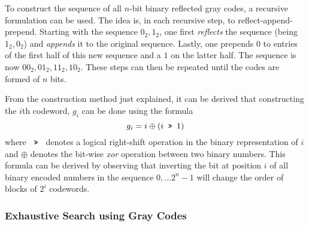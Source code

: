 To construct the sequence of all $n$-bit binary reflected gray codes, a recursive formulation can be used. The idea is, in each recursive step, to reflect-append-prepend. Starting with the sequence $0_2, 1_2$, one first \textit{reflects} the sequence (being $1_2, 0_2$) and \textit{appends} it to the original sequence. Lastly, one prepends $0$ to entries of the first half of this new sequence and a $1$ on the latter half. The sequence is now $00_2, 01_2, 11_2, 10_2$. These steps can then be repeated until the codes are formed of $n$ bits.

From the construction method just explained, it can be derived that constructing the $i$th codeword, $g_i$ can be done using the formula
$$
    g_i = i \oplus (i \texttt{ >> } 1)
$$
where $\texttt{ >> }$ denotes a logical right-shift operation in the binary representation of $i$ and $\oplus$ denotes the bit-wise \textit{xor} operation between two binary numbers. This formula can be derived by observing that inverting the bit at position $i$ of all binary encoded numbers in the sequence $0,\dots 2^{n} - 1$ will change the order of blocks of $2^i$ codewords.

\subsubsection{Exhaustive Search using Gray Codes} \label{sec:prereq:fes:exh_g_code}

